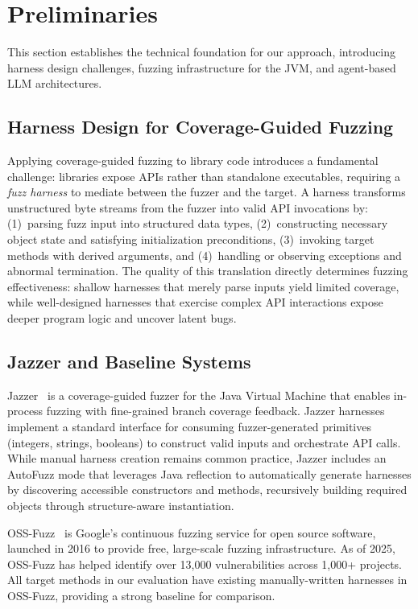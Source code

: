 
\section{Preliminaries}

This section establishes the technical foundation for our approach, introducing harness design challenges, fuzzing infrastructure for the JVM, and agent-based LLM architectures.

\subsection{Harness Design for Coverage-Guided Fuzzing}
\label{sec:prelim:fuzzing}

Applying coverage-guided fuzzing to library code introduces a fundamental challenge: libraries expose APIs rather than standalone executables, requiring a \emph{fuzz harness} to mediate between the fuzzer and the target. A harness transforms unstructured byte streams from the fuzzer into valid API invocations by: (1)~parsing fuzz input into structured data types, (2)~constructing necessary object state and satisfying initialization preconditions, (3)~invoking target methods with derived arguments, and (4)~handling or observing exceptions and abnormal termination. The quality of this translation directly determines fuzzing effectiveness: shallow harnesses that merely parse inputs yield limited coverage, while well-designed harnesses that exercise complex API interactions expose deeper program logic and uncover latent bugs.

\subsection{Jazzer and Baseline Systems}
\label{sec:prelim:jazzer}

Jazzer~\cite{CITE:Jazzer} is a coverage-guided fuzzer for the Java Virtual Machine that enables in-process fuzzing with fine-grained branch coverage feedback. Jazzer harnesses implement a standard interface for consuming fuzzer-generated primitives (integers, strings, booleans) to construct valid inputs and orchestrate API calls. While manual harness creation remains common practice, Jazzer includes an AutoFuzz mode that leverages Java reflection to automatically generate harnesses by discovering accessible constructors and methods, recursively building required objects through structure-aware instantiation.

OSS-Fuzz~\cite{CITE:OSSFuzz} is Google's continuous fuzzing service for open source software, launched in 2016 to provide free, large-scale fuzzing infrastructure. As of 2025, OSS-Fuzz has helped identify over 13,000 vulnerabilities across 1,000+ projects. All target methods in our evaluation have existing manually-written harnesses in OSS-Fuzz, providing a strong baseline for comparison.


